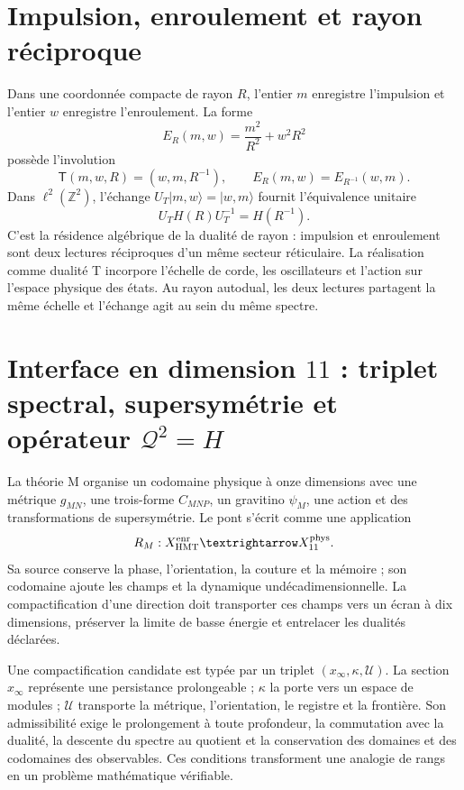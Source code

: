 \section{Impulsion, enroulement et rayon réciproque}

Dans une coordonnée compacte de rayon \(R\), l'entier \(m\) enregistre l'impulsion et
l'entier \(w\) enregistre l'enroulement. La forme
\[
 E_R(m,w)=\frac{m^2}{R^2}+w^2R^2
\]
possède l'involution
\[
 \mathsf T(m,w,R)=(w,m,R^{-1}),
 \qquad
 E_R(m,w)=E_{R^{-1}}(w,m).
\]
Dans \(\ell^2(\mathbb Z^2)\), l'échange
\(U_T\lvert m,w\rangle=\lvert w,m\rangle\) fournit l'équivalence
unitaire
\[
 U_TH(R)U_T^{-1}=H(R^{-1}).
\]
C'est la résidence algébrique de la dualité de rayon : impulsion et
enroulement sont deux lectures réciproques d'un même secteur réticulaire. La
réalisation comme dualité T incorpore l'échelle de corde, les oscillateurs et
l'action sur l'espace physique des états. Au rayon autodual, les deux
lectures partagent la même échelle et l'échange agit au sein du même
spectre.

\section{Interface en dimension \(11\) : triplet spectral, supersymétrie et opérateur \(\mathcal Q^2=H\)}

La théorie M organise un codomaine physique à onze dimensions avec une métrique
\(g_{MN}\), une trois-forme \(C_{MNP}\), un gravitino \(\psi_M\), une action et des
transformations de supersymétrie. Le pont s'écrit comme une application
\[
 \mathfrak R_M:\mathcal X_{\rm HMT}^{\rm enr}
 \longrightarrow\mathcal X_{11}^{\rm phys}.
\]
Sa source conserve la phase, l'orientation, la couture et la mémoire ; son codomaine ajoute
les champs et la dynamique undécadimensionnelle. La compactification d'une
direction doit transporter ces champs vers un écran à dix dimensions,
préserver la limite de basse énergie et entrelacer les dualités déclarées.

Une compactification candidate est typée par un triplet
\((x_\infty,\kappa,\mathcal U)\). La section \(x_\infty\) représente une
persistance prolongeable ; \(\kappa\) la porte vers un espace de modules ;
\(\mathcal U\) transporte la métrique, l'orientation, le registre et la frontière. Son
admissibilité exige le prolongement à toute profondeur, la commutation avec la
dualité, la descente du spectre au quotient et la conservation des domaines et des
codomaines des observables. Ces conditions transforment une analogie de
rangs en un problème mathématique vérifiable.

